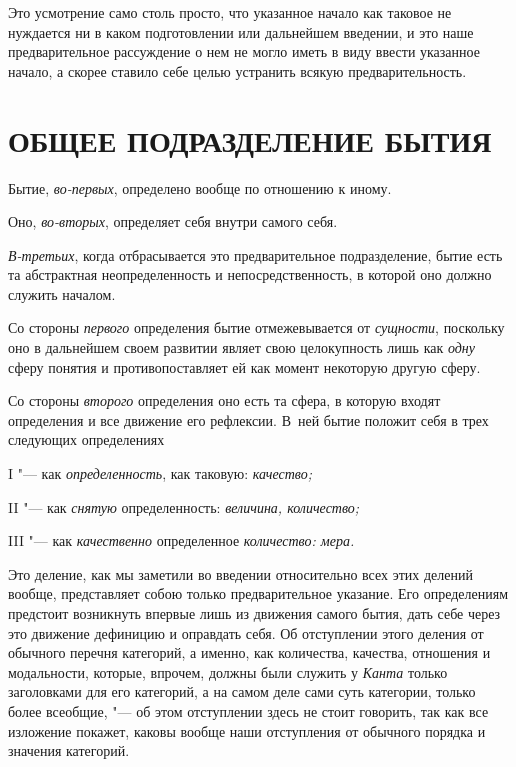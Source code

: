Это усмотрение само столь просто, что указанное начало как таковое не
нуждается ни в каком подготовлении или дальнейшем введении, и это наше
предварительное рассуждение о нем не могло иметь в виду ввести указанное
начало, а скорее ставило себе целью устранить всякую предварительность.

\section[Общее подразделение бытия]{ОБЩЕЕ ПОДРАЗДЕЛЕНИЕ БЫТИЯ}
Бытие, {\em во-первых}, определено вообще по отношению к иному.

Оно, {\em во-вторых}, определяет себя внутри самого себя.

{\em В-третьих}, когда отбрасывается это предварительное
подразделение, бытие есть та абстрактная неопределенность и
непосредственность, в которой оно должно служить началом.

Со стороны {\em первого} определения бытие
отмежевывается от {\em сущности}, поскольку оно в
дальнейшем своем развитии являет свою целокупность лишь как
{\em одну} сферу понятия и противопоставляет ей как
момент некоторую другую сферу.

Со стороны {\em второго} определения оно есть та сфера,
в которую входят определения и все движение его рефлексии. В~ней бытие
положит себя в трех следующих определениях

I "--- как {\em определенность}, как таковую: {\em качество;}

II "--- как {\em снятую} определенность: {\em величина, количество;}

III "--- как {\em качественно} определенное {\em количество: мера.}

Это деление, как мы заметили во введении относительно всех этих делений
вообще, представляет собою только предварительное указание. Его
определениям предстоит возникнуть впервые лишь из движения самого бытия,
дать себе через это движение дефиницию и оправдать себя. Об отступлении
этого деления от обычного перечня категорий, а именно, как количества,
качества, отношения и модальности, которые, впрочем, должны были служить у
{\em Канта} только заголовками для его категорий, а на
самом деле сами суть категории, только более всеобщие, "--- об этом
отступлении здесь не стоит говорить, так как все изложение покажет, каковы
вообще наши отступления от обычного порядка и значения категорий.

